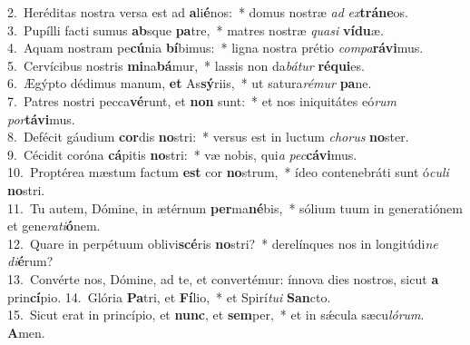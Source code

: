 {2.~}Heréditas nostra versa est ad \textbf{a}li\textbf{é}nos:~* domus nostræ \textit{ad} \textit{ex}\textbf{trá}\textbf{ne}os.\\
{3.~}Pupílli facti sumus \textbf{ab}sque \textbf{pa}tre,~* matres nostræ \textit{qua}\textit{si} \textbf{ví}\textbf{du}æ.\\
{4.~}Aquam nostram pe\textbf{cú}nia \textbf{bí}bimus:~* ligna nostra prétio \textit{com}\textit{pa}\textbf{rá}\textbf{vi}mus.\\
{5.~}Cervícibus nostris \textbf{mi}na\textbf{bá}mur,~* lassis non da\textit{bá}\textit{tur} \textbf{ré}\textbf{qui}es.\\
{6.~}Ægýpto dédimus manum, \textbf{et} As\textbf{sý}riis,~* ut satura\textit{ré}\textit{mur} \textbf{pa}ne.\\
{7.~}Patres nostri pecca\textbf{vé}runt, et \textbf{non} sunt:~* et nos iniquitátes eó\textit{rum} \textit{por}\textbf{tá}\textbf{vi}mus.\\
{8.~}Defécit gáudium \textbf{cor}dis \textbf{no}stri:~* versus est in luctum \textit{cho}\textit{rus} \textbf{no}ster.\\
{9.~}Cécidit coróna \textbf{cá}pitis \textbf{no}stri:~* væ nobis, qui\textit{a} \textit{pec}\textbf{cá}\textbf{vi}mus.\\
{10.~}Proptérea mæstum factum \textbf{est} cor \textbf{no}strum,~* ídeo contenebráti sunt ó\textit{cu}\textit{li} \textbf{no}stri.\\
{11.~}Tu autem, Dómine, in ætérnum \textbf{per}ma\textbf{né}bis,~* sólium tuum in generatiónem et gene\textit{ra}\textit{ti}\textbf{ó}nem.\\
{12.~}Quare in perpétuum oblivi\textbf{scé}ris \textbf{no}stri?~* derelínques nos in longitúdi\textit{ne} \textit{di}\textbf{é}rum?\\
{13.~}Convérte nos, Dómine, ad te, et convertémur: ínnova dies nostros, sicut \textbf{a} prin\textbf{cí}pio.
{14.~}Glória \textbf{Pa}tri, et \textbf{Fí}lio,~* et Spirí\textit{tu}\textit{i} \textbf{San}cto.\\
{15.~}Sicut erat in princípio, et \textbf{nunc}, et \textbf{sem}per,~* et in sǽcula sæcu\textit{ló}\textit{rum}. \textbf{A}men.\\
